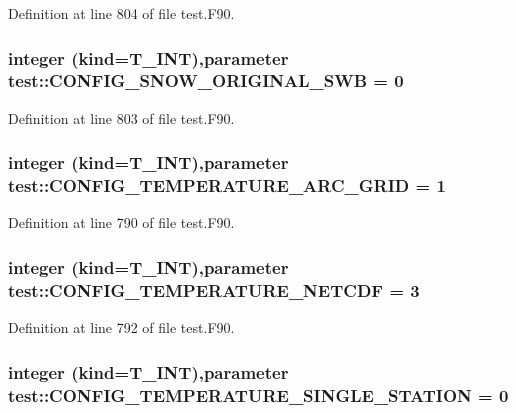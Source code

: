Definition at line 804 of file test.F90.

\hypertarget{namespacetest_abb5d4895f4dc2885162f36d22c55a9df}{
\subsubsection[{CONFIG\_\-SNOW\_\-ORIGINAL\_\-SWB}]{\setlength{\rightskip}{0pt plus 5cm}integer (kind={\bf T\_\-INT}),parameter {\bf test::CONFIG\_\-SNOW\_\-ORIGINAL\_\-SWB} = 0}}
\label{namespacetest_abb5d4895f4dc2885162f36d22c55a9df}


Definition at line 803 of file test.F90.

\hypertarget{namespacetest_a608c6b33ac0a09611c41b079eb5a4608}{
\subsubsection[{CONFIG\_\-TEMPERATURE\_\-ARC\_\-GRID}]{\setlength{\rightskip}{0pt plus 5cm}integer (kind={\bf T\_\-INT}),parameter {\bf test::CONFIG\_\-TEMPERATURE\_\-ARC\_\-GRID} = 1}}
\label{namespacetest_a608c6b33ac0a09611c41b079eb5a4608}


Definition at line 790 of file test.F90.

\hypertarget{namespacetest_afbea0dcb66b0963f92f65620b40b4d85}{
\subsubsection[{CONFIG\_\-TEMPERATURE\_\-NETCDF}]{\setlength{\rightskip}{0pt plus 5cm}integer (kind={\bf T\_\-INT}),parameter {\bf test::CONFIG\_\-TEMPERATURE\_\-NETCDF} = 3}}
\label{namespacetest_afbea0dcb66b0963f92f65620b40b4d85}


Definition at line 792 of file test.F90.

\hypertarget{namespacetest_ae5b28f5f9060952cfc4b6dd836f27bb1}{
\subsubsection[{CONFIG\_\-TEMPERATURE\_\-SINGLE\_\-STATION}]{\setlength{\rightskip}{0pt plus 5cm}integer (kind={\bf T\_\-INT}),parameter {\bf test::CONFIG\_\-TEMPERATURE\_\-SINGLE\_\-STATION} = 0}}
\label{namespacetest_ae5b28f5f9060952cfc4b6dd836f27bb1}


